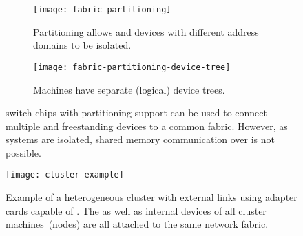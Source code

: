 \begin{figure}
    \centering
    \begin{subfigure}{\linewidth}
        \centering
        \texttt{[image: fabric-partitioning]}
        \caption{Partitioning allows  and devices with different address domains to be isolated.}
    \end{subfigure}
    \par\vspace{5mm}
    \begin{subfigure}{\linewidth}
        \centering
        \texttt{[image: fabric-partitioning-device-tree]}
        \caption{Machines have separate (logical)  device trees.}
    \end{subfigure}
    \caption[ switch chips with partitioning support can be used to connect multiple  and freestanding devices to a common  fabric.]
    { switch chips with partitioning support can be used to connect multiple  and freestanding devices to a common  fabric. However, as systems are isolated, shared memory communication over  is not possible.}
  	\label{fig:partitioning}
\end{figure}



\begin{figure}
	\centering
    \texttt{[image: cluster-example]}
    \caption[Example of a heterogeneous -networked cluster with  adapter cards and external cables]{Example of a heterogeneous  cluster with external  links using adapter cards capable of . The  as well as internal devices of all cluster machines~(nodes) are all attached to the same  network fabric.}
  	\label{fig:cluster-example}
\end{figure}



